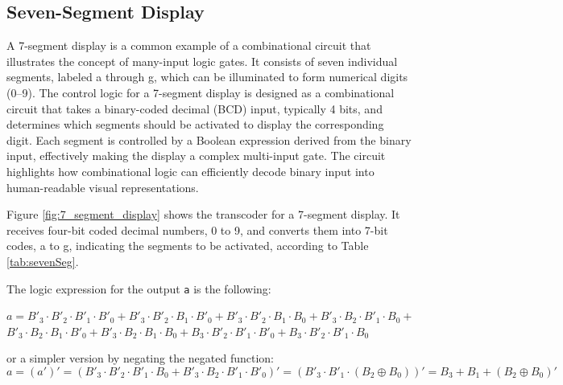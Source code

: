 \subsection{Seven-Segment Display}
A 7-segment display is a common example of a combinational circuit that illustrates the concept of many-input logic gates. It consists of seven individual segments, labeled a through g, which can be illuminated to form numerical digits (0–9). The control logic for a 7-segment display is designed as a combinational circuit that takes a binary-coded decimal (BCD) input, typically 4 bits, and determines which segments should be activated to display the corresponding digit. Each segment is controlled by a Boolean expression derived from the binary input, effectively making the display a complex multi-input gate. The circuit highlights how combinational logic can efficiently decode binary input into human-readable visual representations.


Figure \ref{fig:7_segment_display} shows the transcoder for a 7-segment display. It receives four-bit coded decimal numbers, 0 to 9, and converts them into 7-bit codes, a to g, indicating the segments to be activated, according to Table \ref{tab:sevenSeg}.

The logic expression for the output {\tt a} is the following:
\begin{center}
$a =   B'_3 \cdot B'_2 \cdot B'_1\cdot B'_0  + B'_3 \cdot B'_2 \cdot B_1\cdot B'_0  +
        B'_3 \cdot B'_2 \cdot B_1\cdot B_0  + B'_3 \cdot B_2 \cdot B'_1\cdot B_0  + $ \\
        $B'_3 \cdot B_2 \cdot B_1\cdot B'_0  + B'_3 \cdot B_2 \cdot B_1\cdot B_0  +
        B_3 \cdot B'_2 \cdot B'_1\cdot B'_0  + B_3 \cdot B'_2 \cdot B'_1\cdot B_0  $
\end{center}
or a simpler version by negating the negated function:
$$a =  (a')' =  (B'_3 \cdot B'_2 \cdot B'_1\cdot B_0  + B'_3 \cdot B_2 \cdot B'_1\cdot B'_0)' = (B'_3 \cdot B'_1 \cdot (B_2 \oplus B_0))' = B_3 + B_1 + (B_2 \oplus B_0)'$$



